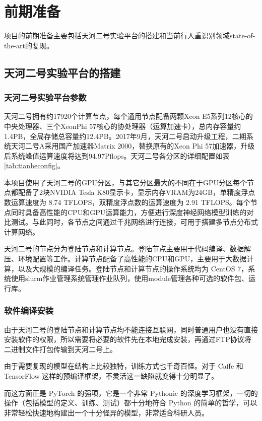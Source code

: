 \section{前期准备}
项目的前期准备主要包括天河二号实验平台的搭建和当前行人重识别领域state-of-the-art的复现。
\subsection{天河二号实验平台的搭建}

\subsubsection{天河二号实验平台参数}

天河二号拥有约17920个计算节点，每个通用节点配备两颗Xeon E5系列12核心的中央处理器、三个XeonPhi 57核心的协处理器（运算加速卡），总内存容量约1.4PB，全局存储总容量约12.4PB\cite{tianhe2018config}。2017年9月，天河二号启动升级工程，二期系统天河二号A采用国产加速器Matrix 2000，替换原有的Xeon Phi 57加速器，升级后系统峰值运算速度将达到94.97Pflops\cite{tianhe2017summary}。天河二号各分区的详细配置如表\ref{tab:tianheconfig}。

本项目使用了天河二号的GPU分区，与其它分区最大的不同在于GPU分区每个节点都配备了2块NVIDIA Tesla K80显示卡，显示内存VRAM为24GB，单精度浮点数运算速度为 8.74 TFLOPS，双精度浮点数的运算速度为 2.91 TFLOPS。每个节点同时具备高性能的CPU和GPU运算能力，方便进行深度神经网络模型训练的对比测试。与此同时，各节点之间通过千兆网络进行连接，可用于搭建多节点分布式计算网络。

天河二号的节点分为登陆节点和计算节点。登陆节点主要用于代码编译、数据解压、环境配置等工作。计算节点配备了高性能的CPU和GPU，主要用于大数据计算，以及大规模的编译任务。登陆节点和计算节点的操作系统均为 CentOS 7，系统使用slurm作业管理系统管理作业队列，使用module管理各种可选的软件包、运行库。

\subsubsection{软件编译安装}

由于天河二号的登陆节点和计算节点均不能连接互联网，同时普通用户也没有直接安装软件的权限，所以需要将必要的软件先在本地完成安装，再通过FTP协议将二进制文件打包传输到天河二号上。

由于需要复现的模型在结构上比较独特，训练方式也千奇百怪。对于 Caffe 和 TensorFlow 这样的预编译框架，不灵活这一缺陷就变得十分明显了。

而这方面正是 PyTorch 的强项，它是一个非常 Pythonic 的深度学习框架，一切的操作（包括模型的定义、训练、测试）都十分地符合 Python 的简单的哲学，可以非常轻松快速地构建出一个十分怪异的模型，非常适合科研人员。

